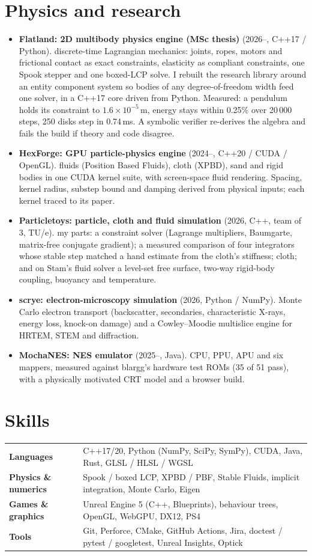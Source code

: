 \documentclass[10pt,a4paper]{article}
\newcommand{\proj}[3]{\item \textbf{#1} \textcolor{muted}{(#2).} #3}
\begin{document}
\section{Physics and research}
\begin{itemize}
\proj{Flatland: 2D multibody physics engine (MSc thesis)}{2026--, C++17 / Python}{discrete-time Lagrangian mechanics: joints, ropes, motors and frictional contact as exact constraints, elasticity as compliant constraints, one Spook stepper and one boxed-LCP solve. I rebuilt the research library around an entity component system so bodies of any degree-of-freedom width feed one solver, in a C++17 core driven from Python. Measured: a pendulum holds its constraint to $1.6\times10^{-5}$\,m, energy stays within 0.25\% over 20\,000 steps, 250 disks step in 0.74\,ms. A symbolic verifier re-derives the algebra and fails the build if theory and code disagree.}
\proj{HexForge: GPU particle-physics engine}{2024--, C++20 / CUDA / OpenGL}{fluids (Position Based Fluids), cloth (XPBD), sand and rigid bodies in one CUDA kernel suite, with screen-space fluid rendering. Spacing, kernel radius, substep bound and damping derived from physical inputs; each kernel traced to its paper.}
\proj{Particletoys: particle, cloth and fluid simulation}{2026, C++, team of 3, TU/e}{my parts: a constraint solver (Lagrange multipliers, Baumgarte, matrix-free conjugate gradient); a measured comparison of four integrators whose stable step matched a hand estimate from the cloth's stiffness; cloth; and on Stam's fluid solver a level-set free surface, two-way rigid-body coupling, buoyancy and temperature.}
\proj{scrye: electron-microscopy simulation}{2026, Python / NumPy}{Monte Carlo electron transport (backscatter, secondaries, characteristic X-rays, energy loss, knock-on damage) and a Cowley--Moodie multislice engine for HRTEM, STEM and diffraction.}
\proj{MochaNES: NES emulator}{2025--, Java}{CPU, PPU, APU and six mappers, measured against blargg's hardware test ROMs (35 of 51 pass), with a physically motivated CRT model and a browser build.}
\end{itemize}

\section{Skills}
\begin{tabularx}{\textwidth}{@{}p{3.1cm}X@{}}
\textbf{Languages} & C++17/20, Python (NumPy, SciPy, SymPy), CUDA, Java, Rust, GLSL / HLSL / WGSL \\
\textbf{Physics \& numerics} & Spook / boxed LCP, XPBD / PBF, Stable Fluids, implicit integration, Monte Carlo, Eigen \\
\textbf{Games \& graphics} & Unreal Engine 5 (C++, Blueprints), behaviour trees, OpenGL, WebGPU, DX12, PS4 \\
\textbf{Tools} & Git, Perforce, CMake, GitHub Actions, Jira, doctest / pytest / googletest, Unreal Insights, Optick
\end{tabularx}
\end{document}
